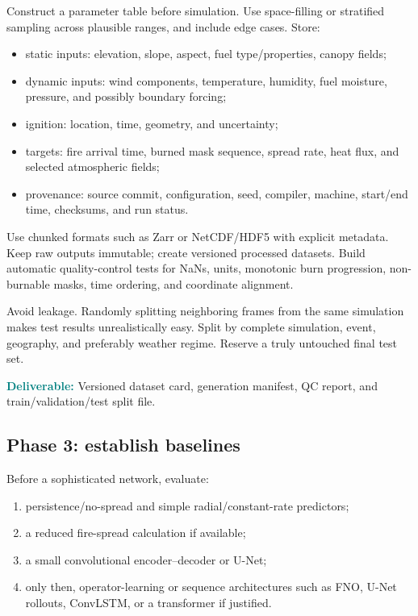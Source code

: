 \documentclass[11pt]{article}
\newcommand{\deliverable}[1]{\textcolor{teal}{\textbf{Deliverable:}} #1}
\begin{document}
Construct a parameter table before simulation. Use space-filling or stratified sampling across plausible ranges, and include edge cases. Store:
\begin{itemize}
  \item static inputs: elevation, slope, aspect, fuel type/properties, canopy fields;
  \item dynamic inputs: wind components, temperature, humidity, fuel moisture, pressure, and possibly boundary forcing;
  \item ignition: location, time, geometry, and uncertainty;
  \item targets: fire arrival time, burned mask sequence, spread rate, heat flux, and selected atmospheric fields;
  \item provenance: source commit, configuration, seed, compiler, machine, start/end time, checksums, and run status.
\end{itemize}

Use chunked formats such as Zarr or NetCDF/HDF5 with explicit metadata. Keep raw outputs immutable; create versioned processed datasets. Build automatic quality-control tests for NaNs, units, monotonic burn progression, non-burnable masks, time ordering, and coordinate alignment.

Avoid leakage. Randomly splitting neighboring frames from the same simulation makes test results unrealistically easy. Split by complete simulation, event, geography, and preferably weather regime. Reserve a truly untouched final test set.

\deliverable{Versioned dataset card, generation manifest, QC report, and train/validation/test split file.}

\subsection{Phase 3: establish baselines}

Before a sophisticated network, evaluate:
\begin{enumerate}
  \item persistence/no-spread and simple radial/constant-rate predictors;
  \item a reduced fire-spread calculation if available;
  \item a small convolutional encoder--decoder or U-Net;
  \item only then, operator-learning or sequence architectures such as FNO, U-Net rollouts, ConvLSTM, or a transformer if justified.
\end{enumerate}
\end{document}
